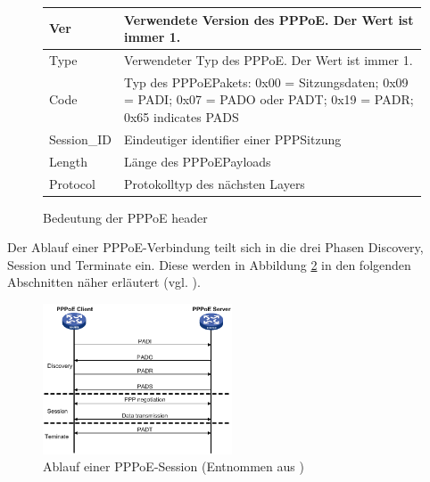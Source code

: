 \documentclass[journal,11pt]{IEEEtran}
\begin{document}
%
%
\begin{figure}[h!]
\begin{tabular}{|l|p{6.2cm}|}
\hline 
Ver & Verwendete Version des PPPoE. Der Wert ist immer 1.\\ 
\hline 
Type & Verwendeter Typ des PPPoE. Der Wert ist immer 1.\\ 
\hline 
Code & Typ des PPPoE\-Pakets: 0x00 = Sitzungsdaten; 0x09 = PADI; 0x07 = PADO oder PADT;
0x19 = PADR; 0x65 indicates PADS\\ 
\hline 
Session\_ID & Eindeutiger identifier einer PPP\-Sitzung\\ 
\hline 
Length & Länge des PPPoE\-Payloads\\ 
\hline 
Protocol & Protokolltyp des nächsten Layers\\ 
\hline
\end{tabular}
\caption{Bedeutung der PPPoE header}
\label{tab:PPPoE_fields}
\end{figure}
%
Der Ablauf einer PPPoE-Verbindung teilt sich in die drei Phasen Discovery, Session und Terminate
ein. Diese werden in Abbildung \ref{fig:pppoe_h3c_sequenz} in den folgenden Abschnitten näher erläutert (vgl. \cite{RFC2516}).\\
%
\begin{figure}[h!]
 \centering
  \includegraphics[width=0.5\textwidth]{img/pppoe_sequenz1.png}
 \caption{Ablauf einer PPPoE-Session (Entnommen aus \cite{pppoe_h3c})}
 \label{fig:pppoe_h3c_sequenz}
\end{figure}
%
\\
\end{document}
